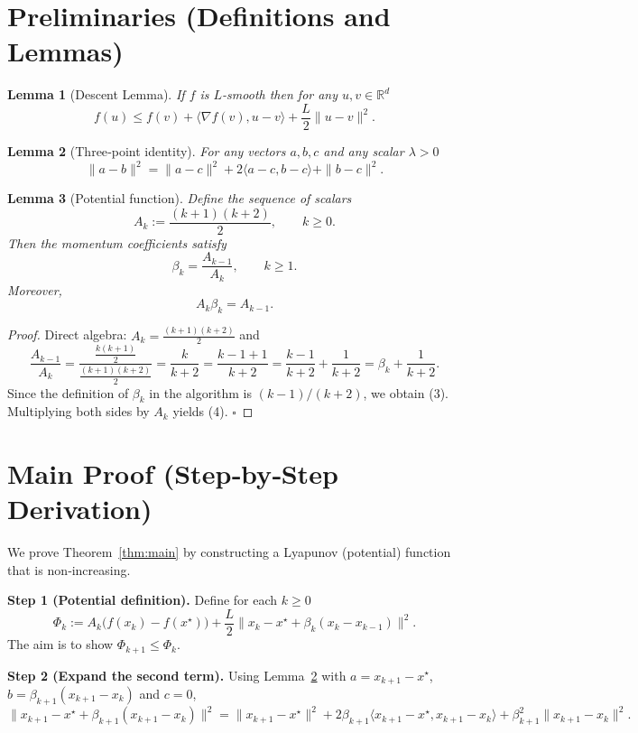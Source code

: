 \documentclass{article}
\newtheorem{lemma}{Lemma}
\newcommand{\grad}{\nabla}
\begin{document}
\section*{Preliminaries (Definitions and Lemmas)}
\begin{lemma}[Descent Lemma]\label{lem:descent}
If \(f\) is \(L\)-smooth then for any \(u,v\in\mathbb{R}^d\)
\[
f(u) \le f(v)+\langle \grad f(v),u-v\rangle+\frac{L}{2}\|u-v\|^2 .
\]
\end{lemma}
\begin{lemma}[Three‑point identity]\label{lem:three}
For any vectors \(a,b,c\) and any scalar \(\lambda>0\)
\[
\|a-b\|^2 = \|a-c\|^2 + 2\langle a-c,b-c\rangle + \|b-c\|^2 .
\]
\end{lemma}
\begin{lemma}[Potential function]\label{lem:potential}
Define the sequence of scalars
\[
A_k:=\frac{(k+1)(k+2)}{2},\qquad k\ge 0 .
\]
Then the momentum coefficients satisfy
\[
\beta_k = \frac{A_{k-1}}{A_k},\qquad k\ge 1 .
\tag{3}
\]
Moreover,
\[
A_k\beta_k = A_{k-1}.
\tag{4}
\]
\end{lemma}
\begin{proof}
Direct algebra: \(A_k=\frac{(k+1)(k+2)}{2}\) and
\[
\frac{A_{k-1}}{A_k}
   =\frac{\frac{k(k+1)}{2}}{\frac{(k+1)(k+2)}{2}}
   =\frac{k}{k+2}
   =\frac{k-1+1}{k+2}
   =\frac{k-1}{k+2}+\frac{1}{k+2}
   =\beta_k+\frac{1}{k+2}.
\]
Since the definition of \(\beta_k\) in the algorithm is \((k-1)/(k+2)\), we obtain (3). Multiplying both sides by \(A_k\) yields (4). \(\square\)
\end{proof}

\section*{Main Proof (Step‑by‑Step Derivation)}
We prove Theorem~\ref{thm:main} by constructing a Lyapunov (potential) function that is non‑increasing.

\medskip
\noindent\textbf{Step 1 (Potential definition).}  
Define for each \(k\ge 0\)
\[
\Phi_k := A_k\bigl(f(x_k)-f(x^\star)\bigr) + \frac{L}{2}\|x_k - x^\star + \beta_k (x_k-x_{k-1})\|^2 .
\tag{5}
\]
The aim is to show \(\Phi_{k+1}\le \Phi_k\).

\medskip
\noindent\textbf{Step 2 (Expand the second term).}  
Using Lemma~\ref{lem:three} with
\(a = x_{k+1}-x^\star\), \(b = \beta_{k+1}(x_{k+1}-x_k)\) and \(c=0\),
\[
\|x_{k+1} - x^\star + \beta_{k+1}(x_{k+1}-x_k)\|^2
   =\|x_{k+1}-x^\star\|^2
    +2\beta_{k+1}\langle x_{k+1}-x^\star , x_{k+1}-x_k\rangle
    +\beta_{k+1}^2\|x_{k+1}-x_k\|^2 .
\tag{6}
\]
\end{document}

